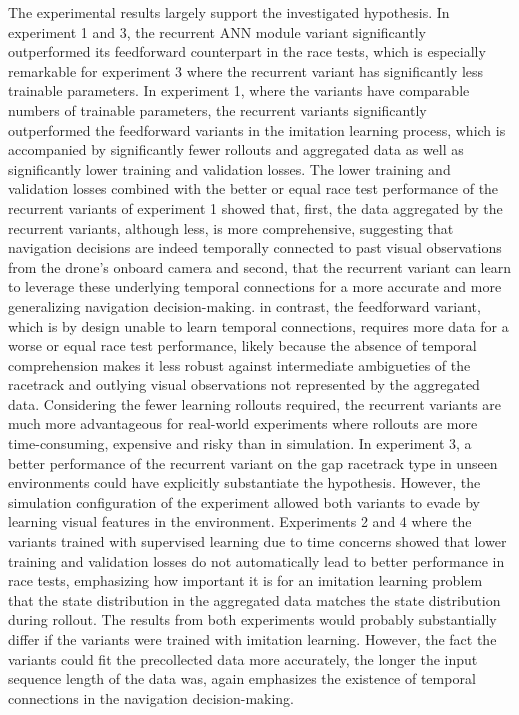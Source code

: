 The experimental results largely support the investigated hypothesis.
In experiment 1 and 3, the recurrent ANN module variant significantly outperformed its feedforward counterpart 
in the race tests, which is especially remarkable for experiment 3
where the recurrent variant has significantly less trainable parameters.
In experiment 1, where the variants have comparable numbers of trainable parameters,
the recurrent variants significantly outperformed the feedforward variants in the imitation learning process,
which is accompanied by significantly fewer rollouts and aggregated data 
as well as significantly lower training and validation losses.
The lower training and validation losses combined with the better or equal race test performance of
the recurrent variants of experiment 1 showed that, first, 
the data aggregated by the recurrent variants, although less, is more comprehensive,
suggesting that navigation decisions are indeed temporally connected 
to past visual observations from the drone's onboard camera
and second, that the recurrent variant can learn to leverage these 
underlying temporal connections for a more accurate and more generalizing navigation decision-making.
in contrast, the feedforward variant, which is by design unable to learn temporal connections,
requires more data for a worse or equal race test performance,
likely because the absence of temporal comprehension makes it 
less robust against intermediate ambigueties of the racetrack 
and outlying visual observations not represented by the aggregated data.
Considering the fewer learning rollouts required,
the recurrent variants are much more advantageous for real-world experiments
where rollouts are more time-consuming, expensive and risky than in simulation.
In experiment 3, a better performance of the recurrent variant on the gap racetrack type 
in unseen environments could have explicitly substantiate the hypothesis.
However, the simulation configuration of the experiment allowed both variants
to evade by learning visual features in the environment.
Experiments 2 and 4 where the variants trained with supervised learning due to time concerns
showed that lower training and validation losses 
do not automatically lead to better performance in race tests, 
emphasizing how important it is for an imitation learning problem
that the state distribution in the aggregated data matches the state distribution during rollout.
The results from both experiments would probably substantially differ 
if the variants were trained with imitation learning.
However, the fact the variants could fit the precollected data more accurately,
the longer the input sequence length of the data was,
again emphasizes the existence of temporal connections in the navigation decision-making.

